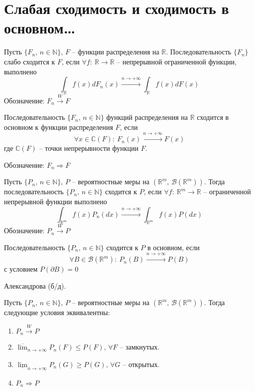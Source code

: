 \section{Слабая сходимость и сходимость в основном\dots}
\begin{definition}
  Пусть $\{F_n,\, n \in \mathbb{N}\},\, F$ -- функции распределения на $\mathbb{R}$. Последовательность $\{F_n\}$ слабо сходится к $F$, если $\forall f:\: \mathbb{R} \to \mathbb{R}$ -- непрерывной ограниченной функции, выполнено
  \[\int_\mathbb{R}f(x)dF_n(x) \stackrel{n \to +\infty}{\to} \int_\mathbb{R}f(x)dF(x)\]
  Обозначение: $F_n \stackrel{W}{\to} F$
\end{definition}

\begin{definition}
  Последовательность $\{F_n,\, n \in \mathbb{N}\}$ функций распределения на $\mathbb{R}$ сходится в основном к функции распределения $F$, если 
  \[\forall x \in \mathbb{C}(F):\: F_n(x) \stackrel{n \to +\infty}{\to} F(x)\]
  где $\mathbb{C}(F)$ -- точки непрерывности функции $F$.

  Обозначение: $F_n \Rightarrow F$
\end{definition}

\begin{definition}
  Пусть $\{P_n,\, n \in \mathbb{N}\},\, P$ -- вероятностные меры на $(\mathbb{R}^m,\, \mathcal{B}(\mathbb{R}^m))$. Тогда последовательность $\{P_n,\, n \in \mathbb{N}\}$ сходится к $P$, если $\forall f:\: \mathbb{R}^m \to \mathbb{R}$ -- ограниченной непрерывной функции выполнено
  \[\int_{\mathbb{R}^m}f(x)P_n(dx) \stackrel{n \to +\infty}{\to} \int_{\mathbb{R}^m}f(x)P(dx)\]
  Обозначение: $P_n \stackrel{W}{\to} P$
\end{definition}

\begin{definition}
  Последовательность $\{P_n,\, n \in \mathbb{N}\}$ сходится к $P$ в основном, если
  \[\forall B \in \mathcal{B}(\mathbb{R}^m):\: P_n(B) \stackrel{n \to +\infty}{\to} P(B)\]
  с условием $P(\partial B) = 0$
\end{definition}

\begin{theorem}
  Александрова (б/д).

  Пусть $\{P_n,\, n \in \mathbb{N}\},\, P$ -- вероятностные меры на $(\mathbb{R}^m,\, \mathcal{B}(\mathbb{R}^m))$. Тогда следующие условия эквивалентны:
  \begin{enumerate}
    \item $P_n \stackrel{W}{\to} P$
    \item $\overline{\lim}_{n \to +\infty} P_n(F) \leq P(F),\, \forall F$ -- замкнутых.
    \item $\underline{\lim}_{n \to +\infty}P_n(G) \geq P(G),\, \forall G$ -- открытых.
    \item $P_n \Rightarrow P$
  \end{enumerate}
\end{theorem}

